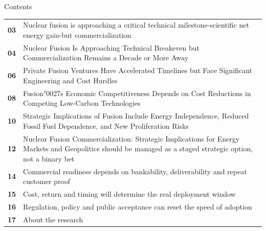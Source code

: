 \documentclass[10pt,a4paper]{article}
\newcommand{\BOApos}{{\BOQuoteFont\char"0027}}
\begin{document}
\clearpage
{\sffamily\fontsize{26}{31}\selectfont\color{BONavy} Contents}\par\vspace{10pt}
\begin{tabularx}{\linewidth}{p{14mm}Y}
\textcolor{BOGreen}{\bfseries 03} & Nuclear fusion is approaching a critical technical milestone-scientific net energy gain-but commercialization \\[5pt]
\textcolor{BOGreen}{\bfseries 04} & Nuclear Fusion Is Approaching Technical Breakeven but Commercialization Remains a Decade or More Away \\[5pt]
\textcolor{BOGreen}{\bfseries 06} & Private Fusion Ventures Have Accelerated Timelines but Face Significant Engineering and Cost Hurdles \\[5pt]
\textcolor{BOGreen}{\bfseries 08} & Fusion\BOApos{}s Economic Competitiveness Depends on Cost Reductions in Competing Low-Carbon Technologies \\[5pt]
\textcolor{BOGreen}{\bfseries 10} & Strategic Implications of Fusion Include Energy Independence, Reduced Fossil Fuel Dependence, and New Proliferation Risks \\[5pt]
\textcolor{BOGreen}{\bfseries 12} & Nuclear Fusion Commercialization: Strategic Implications for Energy Markets and Geopolitics should be managed as a staged strategic option, not a binary bet \\[5pt]
\textcolor{BOGreen}{\bfseries 14} & Commercial readiness depends on bankability, deliverability and repeat customer proof \\[5pt]
\textcolor{BOGreen}{\bfseries 15} & Cost, return and timing will determine the real deployment window \\[5pt]
\textcolor{BOGreen}{\bfseries 16} & Regulation, policy and public acceptance can reset the speed of adoption \\[5pt]
\textcolor{BOGreen}{\bfseries 17} & About the research \\[5pt]
\end{tabularx}
\clearpage
\end{document}

